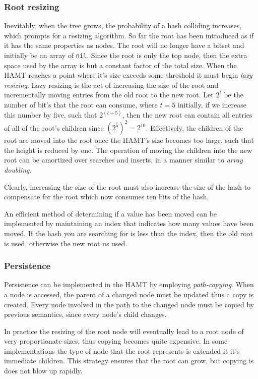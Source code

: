 \subsubsection{Root resizing}
Inevitably, when the tree grows, the probability of a hash colliding increases, which prompts for a resizing algorithm.
So far the root has been introduced as if it has the same properties as nodes.
The root will no longer have a bitset and initially be an array of \texttt{nil}.
Since the root is only the top node, then the extra space used by the array is but a constant factor of the total size.
When the HAMT reaches a point where it's size exceeds some threshold it must begin \textit{lazy resizing}.
Lazy resizing is the act of increasing the size of the root and incrementally moving entries from the old root to the new root.
Let $2^t$ be the number of bit's that the root can consume, where $t = 5$ initially, if we increase this number by five, such that $2^{(t + 5)}$, then the new root can contain all entries of all of the root's children since $(2^5)^2 = 2^{10}$.
Effectively, the children of the root are moved into the root once the HAMT's size becomes too large, such that the height is reduced by one.
The operation of moving the children into the new root can be amortized over searches and inserts, in a manner similar to \textit{array doubling}.

Clearly, increasing the size of the root must also increase the size of the hash to compensate for the root which now consumes ten bits of the hash.

An efficient method of determining if a value has been moved can be implemented by maintaining an index that indicates how many values have been moved.
If the hash you are searching for is less than the index, then the old root is used, otherwise the new root us used.

\subsubsection{Persistence}
Persistence can be implemented in the HAMT by employing \textit{path-copying}.
When a node is accessed, the parent of a changed node must be updated thus a copy is created.
Every node involved in the path to the changed node must be copied by previous semantics, since every node's child changes.
\begin{remark}
  In practice the resizing of the root node will eventually lead to a root node of very proportionate sizes, thus copying becomes quite expensive.
  In some implementations the type of node that the root represents is extended it it's immediate children.
  This strategy ensures that the root can grow, but copying is does not blow up rapidly.
\end{remark}

